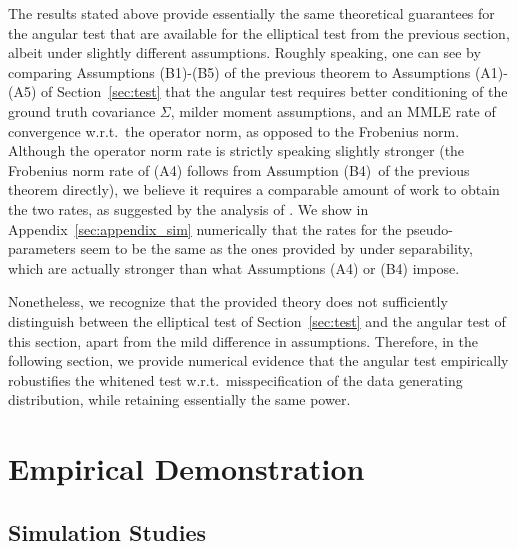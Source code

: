 \documentclass[12pt]{article}
\begin{document}
The results stated above provide essentially the same theoretical guarantees for the angular test that are available for the elliptical test from the previous section, albeit under slightly different assumptions. Roughly speaking, one can see by comparing Assumptions (B1)-(B5) of the previous theorem to Assumptions (A1)-(A5) of Section~\ref{sec:test} that the angular test requires better conditioning of the ground truth covariance $\Sigma$, milder moment assumptions, and an MMLE rate of convergence w.r.t.~the operator norm, as opposed to the Frobenius norm. Although the operator norm rate is strictly speaking slightly stronger (the Frobenius norm rate of (A4) follows from Assumption (B4)~of the previous theorem directly), we believe it requires a comparable amount of work to obtain the two rates, as suggested by the analysis of \citet{franks2026near}. We show in Appendix~\ref{sec:appendix_sim} numerically that the rates for the pseudo-parameters seem to be the same as the ones provided by \citet{franks2026near} under separability, which are actually stronger than what Assumptions (A4) or (B4) impose.









Nonetheless, we recognize that the provided theory does not sufficiently distinguish between the elliptical test of Section~\ref{sec:test} and the angular test of this section, apart from the mild difference in assumptions. Therefore, in the following section, we provide numerical evidence that the angular test empirically robustifies the whitened test w.r.t.~misspecification of the data generating distribution, while retaining essentially the same power.

\section{Empirical Demonstration}\label{sec:empirical}

\subsection{Simulation Studies}\label{sec:sim}
\end{document}
